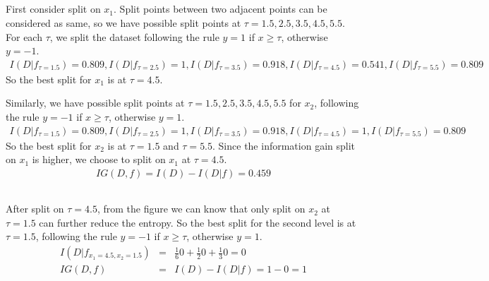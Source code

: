 \documentclass[12pt]{article}
\begin{document}
\subsection{}
First consider split on $x_1$. Split points between two adjacent points can be considered as same, so we have possible split points at $\tau = 1.5, 2.5, 3.5, 4.5, 5.5$. 
For each $\tau$, we split the dataset following the rule $y = 1$ if $x \ge \tau$, otherwise $y = -1$.
\begin{eqnarray}
    I(D|f_{\tau=1.5}) = 0.809, I(D|f_{\tau=2.5}) = 1, I(D|f_{\tau=3.5}) = 0.918, I(D|f_{\tau=4.5}) = 0.541, I(D|f_{\tau=5.5}) = 0.809 \nonumber
\end{eqnarray}
So the best split for $x_1$ is at $\tau = 4.5$.

Similarly, we have possible split points at $\tau = 1.5, 2.5, 3.5, 4.5, 5.5$ for $x_2$, following the rule $y = -1$ if $x \ge \tau$, otherwise $y = 1$.
\begin{eqnarray}
    I(D|f_{\tau=1.5}) = 0.809, I(D|f_{\tau=2.5}) = 1, I(D|f_{\tau=3.5}) = 0.918, I(D|f_{\tau=4.5}) = 1, I(D|f_{\tau=5.5}) = 0.809 \nonumber
\end{eqnarray}
So the best split for $x_2$ is at $\tau = 1.5$ and $\tau = 5.5$. Since the information gain split on $x_1$ is higher, we choose to split on $x_1$ at $\tau = 4.5$.
\begin{eqnarray}
    IG(D, f) = I(D) - I(D|f) = 0.459 \nonumber
\end{eqnarray}

\subsection{}
After split on $\tau = 4.5$, from the figure we can know that only split on $x_2$ at $\tau = 1.5$ can further reduce the entropy. So the best split for the second level is at $\tau = 1.5$, following the rule $y = -1$ if $x \ge \tau$, otherwise $y = 1$.
\begin{eqnarray}
    I(D|f_{x_1=4.5, x_2=1.5}) &=& \frac{1}{6}0 + \frac{1}{2}0 + \frac{1}{3}0 = 0 \nonumber\\
    IG(D, f) &=& I(D) - I(D|f) = 1 - 0 = 1 \nonumber \\
\end{eqnarray}
\end{document}
